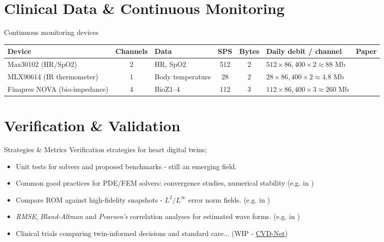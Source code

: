 \documentclass{beamer}
\begin{document}
\section{Clinical Data \& Continuous Monitoring}
\begin{frame}{Continuous monitoring devices}

  \scriptsize
  \begin{tabularx}{\textwidth}{|Y|c|Y|c|c|Y|c|}
  \hline
  \textbf{Device} & \textbf{Channels} & \textbf{Data} & \textbf{SPS} & \textbf{Bytes} & \textbf{Daily debit / channel} & \textbf{Paper} \\
  \hline
  Max30102 (HR/SpO2) 
  & 2 
  & HR, SpO2 
  & 512 
  & 2 
  & $512 \times 86{,}400 \times 2 \approx 88$ Mb 
  & \cite{jameil2025digital} \\
  \hline
  MLX90614 (IR thermometer) 
  & 1 
  & Body temperature 
  & 28 
  & 2 
  & $28 \times 86{,}400 \times 2 \approx 4.8$ Mb 
  & \cite{jameil2025digital} \\
  \hline
  Finapres NOVA (bio-impedance) 
  & 4 
  & BioZ1--4 
  & 112 
  & 3 
  & $112 \times 86{,}400 \times 3 \approx 260$ Mb 
  & \cite{jafari2022} \\
  \hline
  \end{tabularx}
  
\end{frame}

\section{Verification \& Validation}
\begin{frame}{Strategies \& Metrics}
    Verification strategies for heart digital twins;

    \begin{itemize}
        \item Unit tests for solvers and proposed benchmarks - still an emerging field. \textcite{Reidmen2025}
        \item Common good practices for PDE/FEM solvers: convergence studies, numerical stability (e.g. in \textcite{gerach2021electro})
        \item Compare ROM against high-fidelity snapshots - $L^2/L^\infty$ error norm fields. (e.g. in \textcite{Fresca2021})
        \item \textit{RMSE}, \textit{Bland-Altman} and \textit{Pearson’s} correlation analyses for estimated wave forms. (e.g. in \textcite{jafari2022})
        \item Clinical trials comparing twin-informed decisions and standard care... (WIP - \href{https://www.imperial.ac.uk/news/253154/digital-twin-heart-modelling-project-will/?utm_source}{CVD-Net})
    \end{itemize}
\end{frame}
\end{document}
